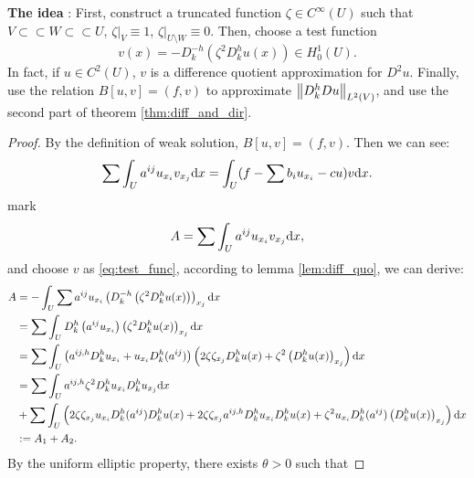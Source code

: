 \textbf{The idea} : First, construct a truncated function $\zeta\in C^{\infty}(U)$ such that $V\subset\subset W\subset\subset U$, $\zeta|_{V}\equiv 1$, $\zeta|_{U\setminus W}\equiv 0$. Then, choose a test function 
\begin{equation}
    \label{eq:test_func}
    v(x)=-D_{k}^{-h}\left(\zeta^{2}D_{k}^{h}u(x)\right)\in H_{0}^{1}(U).
\end{equation}
In fact, if $u\in C^{2}(U)$, $v$ is a difference quotient approximation for $D^{2}u$. Finally, use the relation $B[u,v]=(f,v)$ to approximate $\left\|D_{k}^{h}Du\right\|_{L^{2}(V)}$, and use the second part of theorem \ref{thm:diff_and_dir}.
\begin{proof}
    By the definition of weak solution, $B[u,v]=(f,v)$. Then we can see:
    \begin{equation}
        \label{eq:modified_weak_sol}
        \sum \int_{U}a^{ij}u_{x_{i}}v_{x_{j}}\mathrm{d} x=\int_{U}(f-\sum b_{i}u_{x_{i}}-cu)v\mathrm{d} x.
    \end{equation}
    mark 
    \begin{equation}
        \label{eq:expression_for_A}
        A=\sum\int_{U}a^{ij}u_{x_{i}}v_{x_{j}}\mathrm{d} x,
    \end{equation}
    and choose $v$ as \eqref{eq:test_func}, according to lemma \ref{lem:diff_quo}, we can derive:
    \begin{equation}
        \label{eq:partition_for_A}
        \begin{aligned}
        A&=-\int_{U}\sum a^{ij}u_{x_{i}}\left(D_{k}^{-h}\left(\zeta^{2}D_{k}^{h}u(x)\right)\right)_{x_{j}}\mathrm{d} x\\
        &=\sum\int_{U}D_{k}^{h}\left(a^{ij}u_{x_{i}}\right)\left(\zeta^{2}D_{k}^{h}u(x)\right)_{x_{j}}\mathrm{d} x\\
        &=\sum\int_{U}\left(a^{ij,h}D_{k}^{h}u_{x_{i}}+u_{x_{i}}D_{k}^{h}(a^{ij})\right)\left(2\zeta\zeta_{x_{j}}D_{k}^{h}u(x)+\zeta^{2}\left(D_{k}^{h}u(x)\right)_{x_{j}}\right)\mathrm{d} x\\
        &=\sum\int_{U}a^{ij,h}\zeta^{2}D_{k}^{h}u_{x_{i}}D_{k}^{h}u_{x_{j}}\mathrm{d} x\\
        &+\sum\int_{U}\left(2\zeta\zeta_{x_{j}}u_{x_{i}}D_{k}^{h}(a^{ij})D_{k}^{h}u(x)+2\zeta\zeta_{x_{j}}a^{ij,h}D_{k}^{h}u_{x_{i}}D_{k}^{h}u(x)+\zeta^{2}u_{x_{i}}D_{k}^{h}(a^{ij})\left(D_{k}^{h}u(x)\right)_{x_{j}}\right)\mathrm{d} x\\
        &:=A_{1}+A_{2}.
        \end{aligned}
    \end{equation}
    By the uniform elliptic property, there exists $\theta>0$ such that 

\end{proof}
